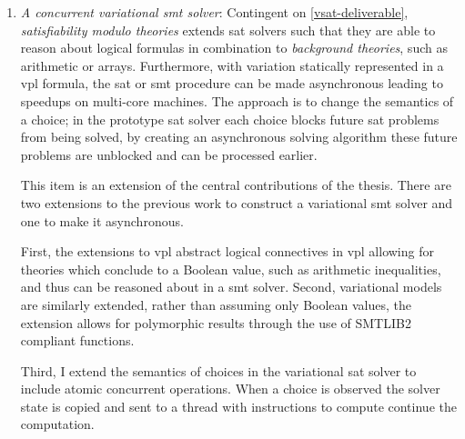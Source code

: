 \begin{enumerate}
\item\label{vsmt-deliverable} \emph{A concurrent variational \ac{smt} solver}:
  Contingent on \autoref{vsat-deliverable}, \emph{satisfiability modulo
    theories} extends \ac{sat} solvers such that they are able to reason about
  logical formulas in combination to \textit{background theories}, such as
  arithmetic or arrays. Furthermore, with variation statically represented in a
  \ac{vpl} formula, the \ac{sat} or \ac{smt} procedure can be made asynchronous
  leading to speedups on multi-core machines. The approach is to change the
  semantics of a choice; in the prototype \ac{sat} solver each choice blocks
  future \ac{sat} problems from being solved, by creating an asynchronous
  solving algorithm these future problems are unblocked and can be processed
  earlier.

  This item is an extension of the central contributions of the thesis. There
  are two extensions to the previous work to construct a variational \ac{smt}
  solver and one to make it asynchronous.

  First, the extensions to \ac{vpl} abstract logical connectives in \ac{vpl}
  allowing for theories which conclude to a Boolean value, such as arithmetic
  inequalities, and thus can be reasoned about in a \ac{smt} solver. Second,
  variational models are similarly extended, rather than assuming only Boolean
  values, the extension allows for polymorphic results through the use of
  SMTLIB2 compliant functions.

  Third, I extend the semantics of choices in the variational \ac{sat} solver to
  include atomic concurrent operations. When a choice is observed the solver
  state is copied and sent to a thread with instructions to compute continue the
  computation.


\end{enumerate}
